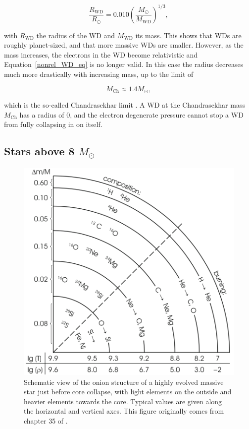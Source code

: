 \documentclass[a4paper,oneside,12pt, class=Latex/Classes/PhDthesisPSnPDF, crop=false]{standalone}
\begin{document}
\begin{equation}
    \label{nonrel_WD_eq}
    \frac{R_\text{WD}}{R_\odot} = 0.010 \left(\frac{M_\odot}{M_\text{WD}}\right)^{1/3},
\end{equation}

with $R_\text{WD}$ the radius of the WD and $M_\text{WD}$ its mass. This shows that WDs are roughly planet-sized, and that more massive WDs are smaller. However, as the mass increases, the electrons in the WD become relativistic and Equation~\ref{nonrel_WD_eq} is no longer valid. In this case the radius decreases much more drastically with increasing mass, up to the limit of 

\begin{equation}
    \label{Chandrasekhar_lim}
    M_\text{Ch} \approx 1.4 M_\odot,
\end{equation}

which is the so-called Chandrasekhar limit \citep{Chandrasekhar_lim}. A WD at the Chandrasekhar mass $M_\text{Ch}$ has a radius of 0, and the electron degenerate pressure cannot stop a WD from fully collapsing in on itself.


\subsection{Stars above 8 $M_\odot$}
\label{ge_8_Msol}

\begin{figure}
    \centering
    \includegraphics[width=\textwidth]{../Images/chapter_1/starstruct.png}
    \caption{Schematic view of the onion structure of a highly evolved massive star just before core collapse, with light elements on the outside and heavier elements towards the core. Typical values are given along the horizontal and vertical axes. This figure originally comes from chapter 35 of \citet{starstruct}.}
    \label{startstruct}
\end{figure}
\end{document}
